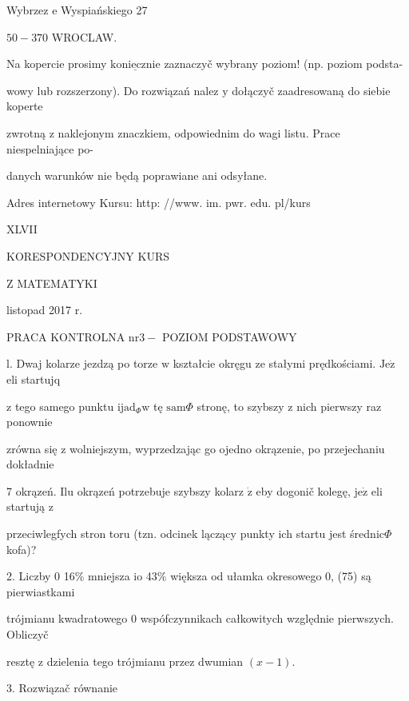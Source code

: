 \documentclass[a4paper,12pt]{article}
\begin{document}
Wybrzez $\mathrm{e}$ Wyspiańskiego 27

$50-370$ WROCLAW.

Na kopercie prosimy $\underline{\mathrm{k}\mathrm{o}\mathrm{n}\mathrm{i}\mathrm{e}\mathrm{c}\mathrm{z}\mathrm{n}\mathrm{i}\mathrm{e}}$ zaznaczyč wybrany poziom! (np. poziom podsta-

wowy lub rozszerzony). Do rozwiązań nalez $\mathrm{y}$ dołączyč zaadresowaną do siebie koperte

zwrotną $\mathrm{z}$ naklejonym znaczkiem, odpowiednim do wagi listu. Prace niespelniające po-

danych warunków nie będą poprawiane ani odsyłane.

Adres internetowy Kursu: http: //www. im. pwr. edu. pl/kurs







XLVII

KORESPONDENCYJNY KURS

Z MATEMATYKI

listopad 2017 r.

PRACA KONTROLNA $\mathrm{n}\mathrm{r} 3-$ POZIOM PODSTAWOWY

l. Dwaj kolarze jezdzą po torze $\mathrm{w}$ kształcie okręgu ze stałymi prędkościami. $\mathrm{J}\mathrm{e}\dot{\mathrm{z}}$ eli startujq

$\mathrm{z}$ tego samego punktu $\mathrm{i}\mathrm{j}\mathrm{a}\mathrm{d}_{\Phi}\mathrm{w}$ tę $\mathrm{s}\mathrm{a}\mathrm{m}\Phi$ stronę, to szybszy $\mathrm{z}$ nich pierwszy raz ponownie

zrówna się $\mathrm{z}$ wolniejszym, wyprzedzając go ojedno okrązenie, po przejechaniu dokładnie

7 okrązeń. Ilu okrązeń potrzebuje szybszy kolarz $\dot{\mathrm{z}}$ eby dogonič kolegę, $\mathrm{j}\mathrm{e}\dot{\mathrm{z}}$ eli startują $\mathrm{z}$

przeciwlegfych stron toru (tzn. odcinek lączący punkty ich startu jest średnic$\Phi$ kofa)?

2. Liczby $0$ 16\% mniejsza $\mathrm{i}\mathrm{o}$ 43\% większa od ułamka okresowego 0, (75) są pierwiastkami

trójmianu kwadratowego $0$ wspófczynnikach całkowitych względnie pierwszych. Obliczyč

resztę $\mathrm{z}$ dzielenia tego trójmianu przez dwumian $(x-1).$

3. Rozwiązač równanie
\end{document}
